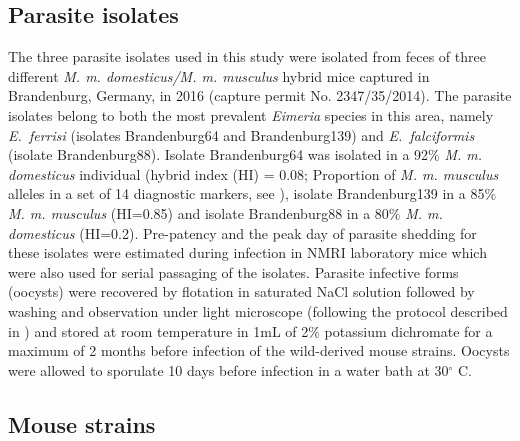 \subsection{Parasite isolates}

The three parasite isolates used in this study were isolated from feces of three different \textit{M. m. domesticus/M. m. musculus} hybrid mice captured in Brandenburg, Germany, in 2016 (capture permit No. 2347/35/2014). The parasite isolates belong to both the most prevalent \textit{Eimeria }species in this area, namely \textit{E.~ferrisi }(isolates Brandenburg64 and Brandenburg139) and \textit{E.~falciformis }(isolate Brandenburg88)\citep{jarquin-diaz_detection_2019}. Isolate Brandenburg64 was isolated in a 92$\%$  \textit{M. m. domesticus} individual (hybrid index (HI) = 0.08; Proportion of \textit{M. m. musculus} alleles in a set of 14 diagnostic markers, see \cite{Balard2020}), isolate Brandenburg139 in a 85$\%$  \textit{M. m. musculus} (HI=0.85) and isolate Brandenburg88 in a 80$\%$  \textit{M. m. domesticus} (HI=0.2). Pre-patency and the peak day of parasite shedding for these isolates were estimated during infection in NMRI laboratory mice \citep{al-khlifeh_eimeria_2019} which were also used for serial passaging of the isolates. Parasite infective forms (oocysts) were recovered by flotation in saturated NaCl solution followed by washing and observation under light microscope (following the protocol described in \cite{clerc_parasitic_2019}) and stored at room temperature in 1mL of 2$\%$  potassium dichromate for a maximum of 2 months before infection of the wild-derived mouse strains. Oocysts were allowed to sporulate 10 days before infection in a water bath at 30$ ^{\circ} $ C.\par

\subsection{Mouse strains}

